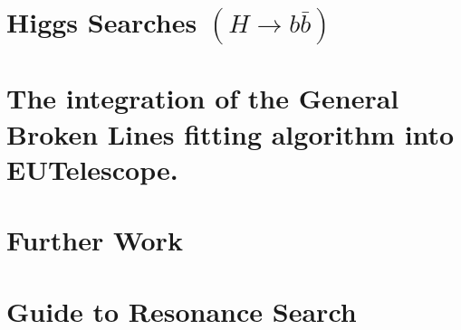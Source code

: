 \documentclass[12pt,a4paper]{report}
\newif\
\newcommand{\twolinesahead}[5][]{
  \def\dist{6};
  \newdimen\ym;
  \newdimen\xm;
  \newdimen\yf;
  \newdimen\xf;
  \ExtractCoordinate{$(#3)$}{\xm}{\ym};
  \ExtractCoordinate{$(#2)$}{\xf}{\yf};
  \ifdim \ym < \yf
  \def\fac{1};
  \else
  \def\fac{-1};
  \fi
  \path [pline] ([yshift=-\dist * \fac]#2.east) -- (#3.west);
  \coordinate (m) at ($(#2)!0.5!(#3)$);
  \coordinate (mp) at ($(m)+(0,1em*\fac)$);
  \node (nm) at (mp) {#5};
  \foreach \x in {\fac,0}
  {
    \ifnum \x = 0
    \path [pline, decoration={markings, mark=at position 0.5 with {\arrow{triangle 60}}}, postaction={decorate}] ([yshift=\dist * \x]#2.east) -- ([yshift=\dist * \x]#4.west);
    \else
    \path [pline] ([yshift=\dist * \x]#2.east) -- ([yshift=\dist * \x]#4.west);
    \fi
  };
}
\begin{document}
%

%


\pagestyle{fancy}

    \fancyhf{}%
    \fancyhead[LE,RO]{\thepage}
    \fancyhead[RE]{\textit{\nouppercase{\rightmark}} }
    \fancyhead[LO]{\textit{\nouppercase{\rightmark}} }
    \renewcommand{\headrulewidth}{0pt} %
    \renewcommand{\footrulewidth}{0pt}

\renewcommand{\chaptermark}[1]{ \markright{\thechapter \hspace{0.2cm} #1}{} }
\renewcommand{\sectionmark}[1]{ \markright{\thesection \hspace{0.2cm} #1}{} }


\chapter{Higgs Searches $(H\rightarrow b\bar{b})$}
\label{chp:res}

\clearpage
\chapter{The integration of the General Broken Lines fitting algorithm into EUTelescope.}
\label{chp:GBL}

\clearpage

\chapter{Further Work }
\label{chp:furtherwork}

\clearpage

\chapter{Guide to Resonance Search}
\label{chp:guide}

\clearpage



\clearpage
\end{document}
